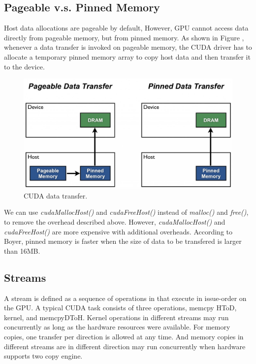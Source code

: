 \documentclass[journal,11pt,onecolumn,draftclsnofoot]{ieeeconf}  %
\begin{document}
\subsection{Pageable v.s. Pinned Memory}
Host data allocations are pageable by default, However, GPU cannot access data directly from pageable memory, but from pinned memory. As shown in Figure \cite{Mark}, whenever a data transfer is invoked on pageable memory, the CUDA driver has to allocate a temporary pinned memory array to copy host data and then transfer it to the device. \par
\begin{figure}[h]
	\centering\includegraphics[width=120mm]{pinned.jpg}
	\caption{CUDA data transfer.\cite{Mark}}
	\label{CUDA data transfer.}
\end{figure}
We can use \textit{cudaMallocHost()} and \textit{cudaFreeHost()} instead of \textit{malloc()} and \textit{free()}, to remove the overhead described above. However, \textit{cudaMallocHost()} and \textit{cudaFreeHost()} are more expensive with additional overheads. According to Boyer\cite{Trade_off}, pinned memory is faster when the size of data to be transfered is larger than 16MB. \par

\subsection{Streams}
A stream is defined as a sequence of operations in that execute in issue-order on the GPU. A typical CUDA task consists of three operations, memcpy HToD, kernel, and memcpyDToH. Kernel operations in different streams may run concurrently as long as the hardware resources were available. For memory copies, one transfer per direction is allowed at any time. And memory copies in different streams are in different direction may run concurrently when hardware supports two copy engine.   \par
\end{document}
